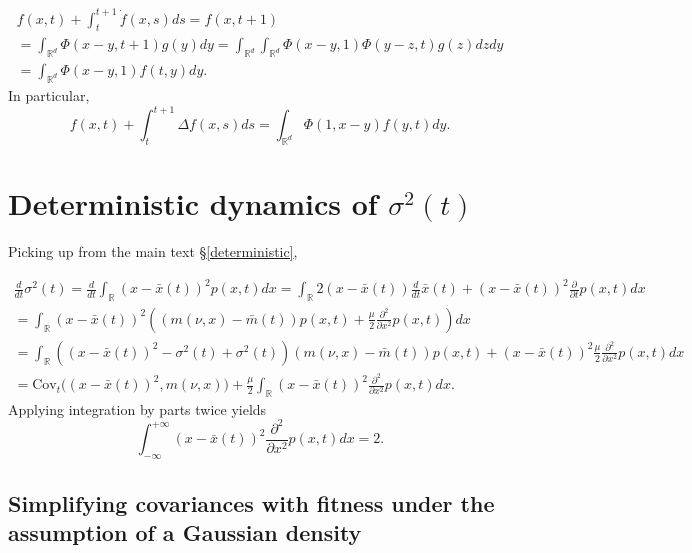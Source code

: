 \documentclass[]{article}
\begin{document}
\begin{multline}
f(x,t)+\int_t^{t+1}\dot f(x,s)ds=f(x,t+1) \\
=\int_{\mathbb{R}^d}\Phi(x-y,t+1)g(y)dy=\int_{\mathbb{R}^d}\int_{\mathbb{R}^d}\Phi(x-y,1)\Phi(y-z,t)g(z)dzdy \\
=\int_{\mathbb{R}^d}\Phi(x-y,1)f(t,y)dy.
\end{multline} In particular, \begin{equation}
f(x,t)+\int_t^{t+1}\Delta f(x,s)ds=\int_{\mathbb{R}^d}\Phi(1,x-y)f(y,t)dy.
\end{equation}

\hypertarget{deterministic-dynamics-of-sigma2t}{%
\section{\texorpdfstring{Deterministic dynamics of \(\sigma^2(t)\)
\label{var_deriv}}{Deterministic dynamics of \textbackslash{}sigma\^{}2(t) }}\label{deterministic-dynamics-of-sigma2t}}

Picking up from the main text \S\ref{deterministic},

\begin{multline}
\frac{d}{dt}\sigma^2(t)=\frac{d}{dt}\int_\mathbb{R}(x-\bar x(t))^2p(x,t)dx=\int_\mathbb{R}2(x-\bar x(t))\frac{d}{dt}{\bar x}(t)+(x-\bar x(t))^2\frac{\partial}{\partial t} p(x,t)dx\\=\int_\mathbb{R}(x-\bar x(t))^2\left((m(\nu,x)-\bar m(t))p(x,t)+\frac{\mu}{2}\frac{\partial^2}{\partial x^2}p(x,t)\right)dx\\=\int_\mathbb{R}\left((x-\bar x(t))^2-\sigma^2(t)+\sigma^2(t)\right)(m(\nu,x)-\bar m(t))p(x,t)+(x-\bar x(t))^2\frac{\mu}{2}\frac{\partial^2}{\partial x^2}p(x,t)dx\\=\mathrm{Cov}_t\Big((x-\bar x(t))^2,m(\nu,x)\Big)+\frac{\mu}{2}\int_\mathbb{R}(x-\bar x(t))^2\frac{\partial^2}{\partial x^2}p(x,t)dx.
\end{multline} Applying integration by parts twice yields
\begin{equation}
\int_{-\infty}^{+\infty}(x-\bar x(t))^2\frac{\partial^2}{\partial x^2}p(x,t)dx=2.
\end{equation}

\hypertarget{simplifying-covariances-with-fitness-under-the-assumption-of-a-gaussian-density}{%
\subsection{\texorpdfstring{Simplifying covariances with fitness under
the assumption of a Gaussian density
\label{cov2deriv}}{Simplifying covariances with fitness under the assumption of a Gaussian density }}\label{simplifying-covariances-with-fitness-under-the-assumption-of-a-gaussian-density}}
\end{document}
